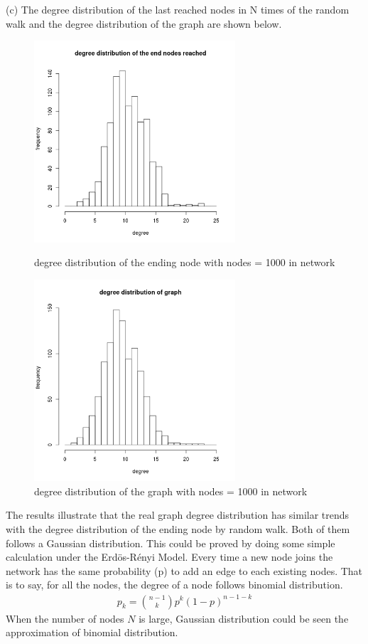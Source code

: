 \documentclass[draftcls,12pt,onecolumn]{IEEEtran}
\begin{document}
(c) The degree distribution of the last reached nodes in N times of the random walk and the degree distribution of the graph are shown below.
\begin{figure}[htbp]
\centering
\begin{minipage}[t]{0.48\textwidth}
\centering
\includegraphics[width=7.5cm]{2_1_c_end_nodes_degree.png}
\caption{degree distribution of the ending node with nodes = 1000 in network}
\label{fig03}
\end{minipage}
\begin{minipage}[t]{0.48\textwidth}
\centering
\includegraphics[width=7.5cm]{2_1_c_graph_degree.png}
\caption{degree distribution of the graph with nodes = 1000 in network}
\label{fig04}
\end{minipage}
\end{figure}

The results illustrate that the real graph degree distribution has similar trends with the degree distribution of the ending node by random walk. Both of them follows a Gaussian distribution. This could be proved by doing some simple calculation under the Erd\"os-R\'enyi Model. Every time a new node joins the network has the same probability (p) to add an edge to each existing nodes. That is to say, for all the nodes, the degree of a node follows binomial distribution.
 \begin{align}
 p_{k} = \binom{n-1}{k} p^{k} (1-p) ^{n-1-k}
 \end{align}
 When the number of nodes $N$ is large, Gaussian distribution could be seen the approximation of binomial distribution. 
\end{document}
